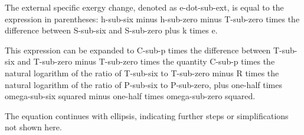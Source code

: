 The external specific exergy change, denoted as e-dot-sub-ext, is equal to the expression in parentheses: h-sub-six minus h-sub-zero minus T-sub-zero times the difference between S-sub-six and S-sub-zero plus k times e.

This expression can be expanded to C-sub-p times the difference between T-sub-six and T-sub-zero minus T-sub-zero times the quantity C-sub-p times the natural logarithm of the ratio of T-sub-six to T-sub-zero minus R times the natural logarithm of the ratio of P-sub-six to P-sub-zero, plus one-half times omega-sub-six squared minus one-half times omega-sub-zero squared.

The equation continues with ellipsis, indicating further steps or simplifications not shown here.